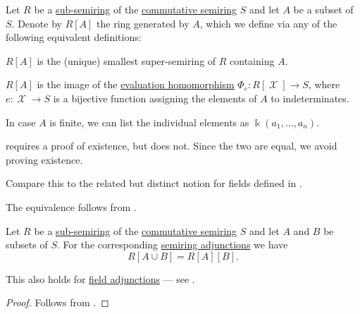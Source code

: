 \begin{definition}\label{def:semiring_adjunction}
  Let \( R \) be a \hyperref[def:ring/submodel]{sub-semiring} of the \hyperref[def:semiring/commutative]{commutative semiring} \( S \) and let \( A \) be a subset of \( S \). Denote by \( R[A] \) the ring generated by  \( A \), which we define via any of the following equivalent definitions:
  \begin{thmenum}
     \( R[A] \) is the (unique) smallest super-semiring of \( R \) containing \( A \).

     \( R[A] \) is the image of the \hyperref[con:substitution_homomorphism]{evaluation homomorphism} \( \Phi_e: R[\mscrX] \to S \), where \( e: \mscrX \to S \) is a bijective function assigning the elements of \( A \) to indeterminates.
  \end{thmenum}

  In case \( A \) is finite, we can list the individual elements as \( \Bbbk(a_1, \ldots, a_n) \).
\end{definition}
\begin{comments}
  \item {} requires a proof of existence, but  does not. Since the two are equal, we avoid proving existence.
  \item Compare this to the related but distinct notion for fields defined in .
\end{comments}
\begin{defproof}
  The equivalence follows from .
\end{defproof}

\begin{proposition}\label{thm:semiring_adjunction_tower}
  Let \( R \) be a \hyperref[def:ring/submodel]{sub-semiring} of the \hyperref[def:semiring/commutative]{commutative semiring} \( S \) and let \( A \) and \( B \) be subsets of \( S \). For the corresponding \hyperref[def:semiring_adjunction]{semiring adjunctions} we have
  \begin{equation*}
    R[A \cup B] = R[A][B].
  \end{equation*}
\end{proposition}
\begin{comments}
  \item This also holds for \hyperref[def:field_adjunction]{field adjunctions} --- see .
\end{comments}
\begin{proof}
  Follows from .
\end{proof}


